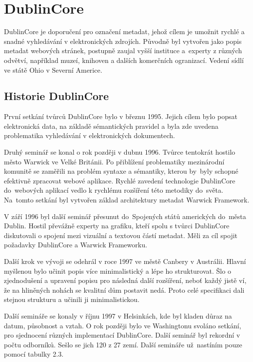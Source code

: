 \section{DublinCore}
\par DublinCore\cite{dublincoredocementation} je doporučení pro označení metadat, jehož cílem je umožnit rychlé a snadné vyhledávání v elektronických zdrojích. Původně byl vytvořen jako popis metadat webových stránek, postupně zaujal vyšší instituce a~experty z různých odvětví, například muzeí, knihoven a dalších komerčních ogranizací. Vedení sídlí ve státě Ohio v Severní Americe.

\subsection{Historie DublinCore}
\par První setkání tvůrců DublinCore\cite{dublincoredocementation} bylo v březnu 1995. Jejich cílem bylo popsat elektronická data, na základě sémantických pravidel a byla zde uvedena problematika vyhledávání v elektronických dokumentech.

\par Druhý seminář se konal o rok později v dubnu 1996. Tvůrce tentokrát hostilo město Warwick ve Velké Británii. Po přiblížení problematiky mezinárodní komunitě se zaměřili na problém syntaxe a sémantiky, kterou by~byly schopné efektivně zpracovat webové aplikace. Rychlé zavedení technologie DublinCore do~webových aplikací vedlo k rychlému rozšíření této metodiky do~světa. Na~tomto setkání byl vytvořen základ architektury metadat Warwick Framework.

\par V září 1996 byl další seminář přesunut do~Spojených států amerických do~města Dublin. Hostil převážně experty na grafiku, kteří spolu s tvůrci DublinCore diskutovali o spojení mezi vizuální a textovou částí metadat. Měli za cíl spojit požadavky DublinCore a Warwick Frameworku.

\par Další krok ve vývoji se odehrál v roce 1997 ve městě Canbery v Austrálii. Hlavní myšlenou bylo učinit popis více minimalistický a lépe ho strukturovat. Šlo o zjednodušení a upravení popisu pro následná další rozšíření, neboť každý jistě ví, že na hliněných nohách se kvalitní dům postavit nedá. Proto celé specifikaci dali stejnou strukturu a učinili ji minimalistickou.

\par Další semináře se konaly v říjnu 1997 v Helsinkách, kde byl kladen důraz na datum, působnost a vztah. O rok později bylo ve Washingtonu svoláno setkání, pro sjednocení různých implementací DublinCore. Další seminář byl rekordní v počtu odborníků. Sešlo se jich 120 z 27 zemí. Další semináře už~nastíním pouze pomocí tabulky 2.3.

